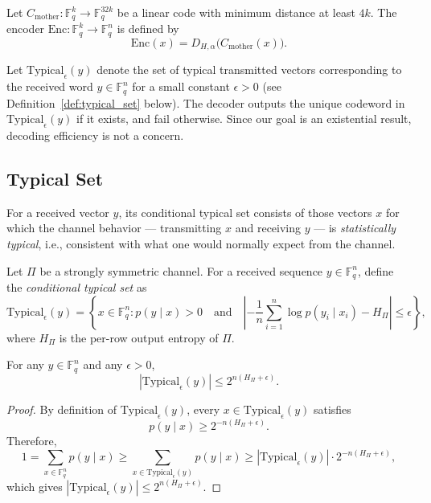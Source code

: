 \documentclass[11pt]{article}
\newcommand{\enc}{\mathrm{Enc}}
\newcommand{\basecode}{C_{\text{mother}}}
\newcommand{\typical}{\mathrm{Typical}}
\theoremstyle{named}
\begin{document}
Let $\basecode:\mathbb{F}_q^k \to \mathbb{F}_q^{32k}$ be a linear code with minimum distance at least $4k$. 
The encoder $\enc:\mathbb{F}_q^k \to \mathbb{F}_q^n$ is defined by
\begin{equation}
    \enc(x) = D_{H, \alpha}\bigl(\basecode(x)\bigr).
\end{equation}

Let $\typical_\epsilon(y)$ denote the set of typical transmitted vectors corresponding to the received word $y \in \mathbb{F}_q^n$ for a small constant $\epsilon > 0$  (see Definition~\ref{def:typical_set} below). The decoder outputs the unique codeword in $\typical_\epsilon(y)$ if it exists, and \textsf{fail} otherwise. Since our goal is an existential result, decoding efficiency is not a concern.



\subsection{Typical Set}


For a received vector $y$, its conditional typical set consists of those vectors $x$ for which the channel behavior --- transmitting $x$ and receiving $y$ --- is \emph{statistically typical}, i.e., consistent with what one would normally expect from the channel.

\begin{definition}
\label{def:typical_set}
Let $\Pi$ be a strongly symmetric channel. For a received sequence $y \in \mathbb{F}_q^n$, define the \emph{conditional typical set} as
\[
\mathrm{Typical}_\epsilon(y) = \left\{ x \in \mathbb{F}_q^n :
p(y \mid x) > 0
\quad \text{and} \quad
\left| -\frac{1}{n} \sum_{i=1}^n \log p(y_i \mid x_i) - H_\Pi \right| \leq \epsilon
\right\},
\]
where $H_\Pi$ is the per-row output entropy of $\Pi$.
\end{definition}

\begin{proposition}
\label{prop:typical_volume}
For any $y \in \mathbb{F}_q^n$ and any $\epsilon > 0$,
\[
|\mathrm{Typical}_\epsilon(y)| \leq 2^{n(H_\Pi + \epsilon)}.
\]
\end{proposition}

\begin{proof}
By definition of $\mathrm{Typical}_\epsilon(y)$, every $x \in \mathrm{Typical}_\epsilon(y)$ satisfies
\[
p(y \mid x) \geq 2^{-n(H_\Pi + \epsilon)}.
\]
Therefore,
\[
1 = \sum_{x \in \mathbb{F}_q^n} p(y \mid x) \geq \sum_{x \in \mathrm{Typical}_\epsilon(y)} p(y \mid x) \geq |\mathrm{Typical}_\epsilon(y)| \cdot 2^{-n(H_\Pi + \epsilon)},
\]
which gives $|\mathrm{Typical}_\epsilon(y)| \leq 2^{n(H_\Pi + \epsilon)}$.
\end{proof}
\end{document}
